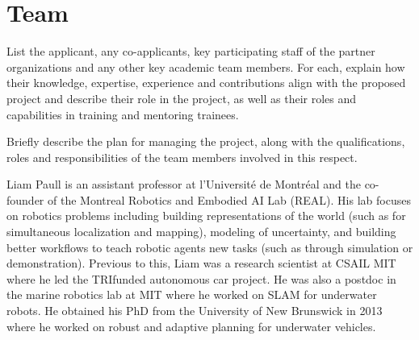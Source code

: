 \documentclass[english,
]{nserc-alliance}
\begin{document}



\section*{Team}
\ifinst\begin{instructions}
  \item List the applicant, any co-applicants, key participating staff of the partner organizations and any other key academic team members. For each, explain how their knowledge, expertise, experience and contributions align with the proposed project and describe their role in the project, as well as their roles and capabilities in training and mentoring trainees.
  \item	Briefly describe the plan for managing the project, along with the qualifications, roles and responsibilities of the team members involved in this respect.
\end{instructions}\fi
  

Liam Paull is an assistant professor at l'Université de Montréal and the co-founder of the Montreal
Robotics and Embodied AI Lab (REAL). His lab focuses on robotics problems including building
representations of the world (such as for simultaneous localization and mapping), modeling of
uncertainty, and building better workflows to teach robotic agents new tasks (such as through simulation
or demonstration). Previous to this, Liam was a research scientist at CSAIL MIT where he led the TRIfunded autonomous car project. He was also a postdoc in the marine robotics lab at MIT where he
worked on SLAM for underwater robots. He obtained his PhD from the University of New Brunswick in
2013 where he worked on robust and adaptive planning for underwater vehicles.
\end{document}
